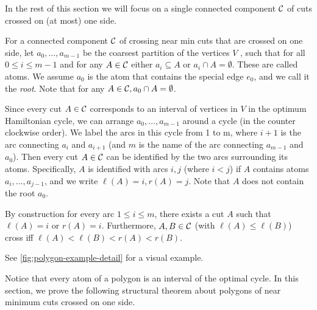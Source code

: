 In the rest of this section we will focus on a single connected component ${\cal C}$ of cuts crossed on (at most) one side.
\begin{definition}[Polygon]\label{def:polygon}
	For a connected component ${\cal C}$ of crossing near min cuts that are crossed on one side, let 
$a_0,\dots,a_{m-1}$  be the coarsest partition of the vertices $V$	, such that for all $0\leq i\leq m-1$ and for any $A\in {\cal C}$ either $a_i\subseteq A$ or $a_i\cap A=\emptyset$. These are called atoms. We assume $a_0$ is the atom that contains the special edge $e_0$, and we call it the {\em root}. 
	Note that for any $A\in {\cal C}, a_0\cap A=\emptyset$. 
	
	Since every cut $A\in {\cal C}$ corresponds to an interval of vertices in $V$ in the optimum Hamiltonian cycle, we can arrange $a_0,\dots,a_{m-1}$ around a cycle (in the counter clockwise order). We label the arcs in this cycle from 1 to m, where $i+1$ is the arc connecting $a_i$ and $a_{i+1}$  (and $m$ is the name of the arc connecting $a_{m-1}$ and $a_0$). Then every cut $A\in {\cal C}$ can be identified by the two arcs surrounding its atoms. %
	 Specifically, $A$ is identified with arcs $i,j$ (where $i<j$) if $A$ contains  atoms $a_{i},\dots, a_{j-1}$, and we write  $\ell(A)=i, r(A)=j$. Note that  $A$ does not contain the root $a_0$. 
	
	By construction for every arc $1\leq i\leq m$, there exists a cut $A$ such that $\ell(A)=i$ or $r(A)=i$. Furthermore, $A,B\in {\cal C}$ (with $\ell(A)\leq \ell(B)$) cross iff $\ell(A) < \ell(B)<r(A)<r(B)$.
	
	See \cref{fig:polygon-example-detail} for a visual example.
\end{definition}

Notice that every atom of a polygon is an interval of the optimal cycle.
In this section, we prove the following structural theorem about polygons of near minimum cuts crossed on one side. 

